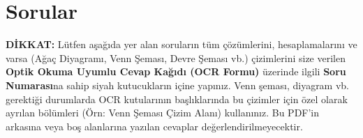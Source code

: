 \documentclass[12pt,a4paper]{article}
\begin{document}
\newpage

\section*{\textbf{\color{TitleColor}Sorular}}

\noindent\colorbox{yellow!40}{%
    \parbox{\dimexpr\linewidth-2\fboxsep\relax}{%
        \textbf{DİKKAT:} Lütfen aşağıda yer alan soruların tüm çözümlerini, hesaplamalarını ve varsa (Ağaç Diyagramı, Venn Şeması, Devre Şeması vb.) çizimlerini size verilen \textbf{Optik Okuma Uyumlu Cevap Kağıdı (OCR Formu)} üzerinde ilgili \textbf{Soru Numarası}na sahip siyah kutucukların içine yapınız. Venn şeması, diyagram vb. gerektiği durumlarda OCR kutularının başlıklarında bu çizimler için özel olarak ayrılan bölümleri ({\color{ChoiceColor}Örn: Venn Şeması Çizim Alanı}) kullanınız. Bu PDF'in arkasına veya boş alanlarına yazılan cevaplar değerlendirilmeyecektir.
    }%
}
\vspace{0.5cm}
\end{document}
